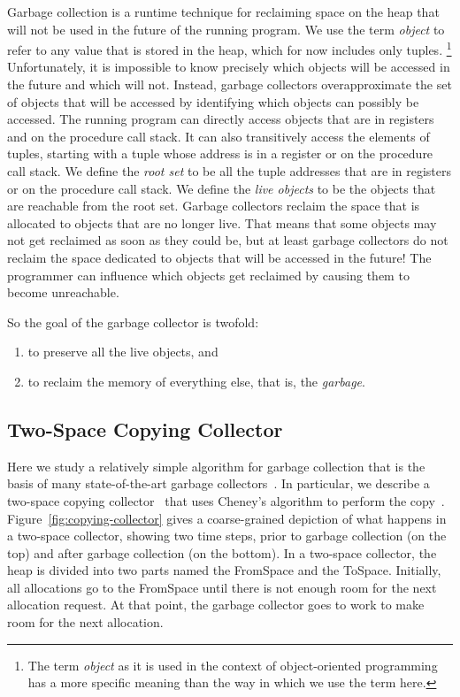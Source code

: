 \documentclass[7x10]{TimesAPriori_MIT}%
\numberwithin{theorem}{chapter}
\numberwithin{definition}{chapter}
\numberwithin{equation}{chapter}
\begin{document}
Garbage collection is a runtime technique for reclaiming space on the
heap that will not be used in the future of the running program. We
use the term \emph{object} to refer to any
value that is stored in the heap, which for now includes only
tuples.%
%
\footnote{The term \emph{object} as it is used in the context of
  object-oriented programming has a more specific meaning than the
  way in which we use the term here.}
%
Unfortunately, it is impossible to know precisely which objects will
be accessed in the future and which will not.  Instead, garbage
collectors overapproximate the set of objects that will be accessed by
identifying which objects can possibly be accessed.  The running
program can directly access objects that are in registers and on the
procedure call stack. It can also transitively access the elements of
tuples, starting with a tuple whose address is in a register or on the
procedure call stack.  We define the \emph{root
set} to be all the tuple addresses that are
in registers or on the procedure call stack.  We define the \emph{live
objects} to be the objects that are
reachable from the root set. Garbage collectors reclaim the space that
is allocated to objects that are no longer live.  That means that some
objects may not get reclaimed as soon as they could be, but at least
garbage collectors do not reclaim the space dedicated to objects that
will be accessed in the future! The programmer can influence which
objects get reclaimed by causing them to become unreachable.

So the goal of the garbage collector is twofold:
\begin{enumerate}
\item to preserve all the live objects, and
\item to reclaim the memory of everything else, that is, the \emph{garbage}.
\end{enumerate}

\subsection{Two-Space Copying Collector}

Here we study a relatively simple algorithm for garbage collection
that is the basis of many state-of-the-art garbage
collectors~\citep{Lieberman:1983aa,Ungar:1984aa,Jones:1996aa,Detlefs:2004aa,Dybvig:2006aa,Tene:2011kx}. In
particular, we describe a two-space copying
collector~\citep{Wilson:1992fk} that uses Cheney's algorithm to
perform the copy~\citep{Cheney:1970aa}.   
Figure~\ref{fig:copying-collector} gives a coarse-grained depiction of
what happens in a two-space collector, showing two time steps, prior
to garbage collection (on the top) and after garbage collection (on
the bottom). In a two-space collector, the heap is divided into two
parts named the FromSpace and the
ToSpace.  Initially, all allocations go to the
FromSpace until there is not enough room for the next allocation
request. At that point, the garbage collector goes to work to make
room for the next allocation.
\end{document}
